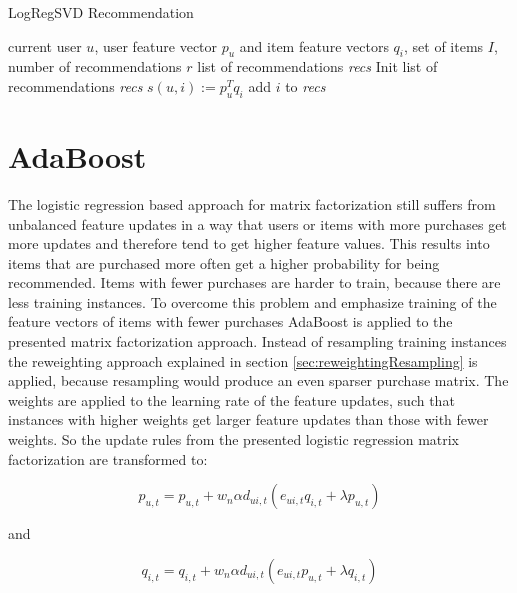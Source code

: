 \documentclass[10pt]{reportMaster}
\begin{document}
\begin{algorithm}
	\caption{LogRegSVD Recommendation}
	\label{alg:LogRegSVDRecommendation}
	\begin{algorithmic}[1]
		\Require current user $u$, user feature vector $p_u$ and item feature vectors $q_i$, set of items $I$, number of recommendations $r$
		\Ensure list of recommendations \textit{recs}
		\State Init list of recommendations \textit{recs}
			\State $s(u,i) := p_u^Tq_i$
			\State add $i$ to \textit{recs}
			\EndIf
		\EndFor
	\end{algorithmic}	
\end{algorithm}

\section{AdaBoost}
\label{sec:myAdaBoost}
The logistic regression based approach for matrix factorization still suffers from unbalanced feature updates in a way that users or items with more purchases get more updates and therefore tend to get higher feature values.
This results into items that are purchased more often get a higher probability for being recommended.
Items with fewer purchases are harder to train, because there are less training instances.
To overcome this problem and emphasize training of the feature vectors of items with fewer purchases AdaBoost is applied to the presented matrix factorization approach.
Instead of resampling training instances the reweighting approach explained in section \ref{sec:reweightingResampling} is applied, because resampling would produce an even sparser purchase matrix.
The weights are applied to the learning rate of the feature updates, such that instances with higher weights get larger feature updates than those with fewer weights.
So the update rules from the presented logistic regression matrix factorization are transformed to: 

\begin{equation}
p_{u,t} = p_{u,t} + w_n \alpha d_{ui,t} (e_{ui,t} q_{i,t} + \lambda p_{u,t})
\end{equation}

and 

\begin{equation}
q_{i,t} = q_{i,t} + w_n \alpha d_{ui,t} (e_{ui,t} p_{u,t} + \lambda q_{i,t})
\end{equation}
\end{document}
